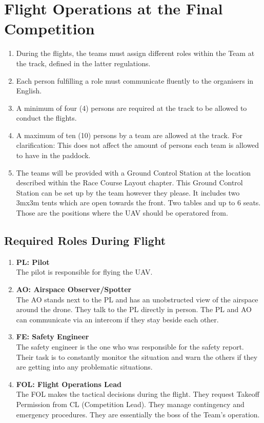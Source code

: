     \section{Flight Operations at the Final Competition}
    \begin{enumerate}
      \item During the flights, the teams must assign different roles within the Team at the track, defined in the latter regulations.
      \item Each person fulfilling a role must communicate fluently to the organisers in English.
      \item A minimum of four (4) persons are required at the track to be allowed to conduct the flights.
      \item A maximum of ten (10) persons by a team are allowed at the track. For clarification: This does not affect the amount of persons each team is allowed to have in the paddock.  
      \item The teams will be provided with a Ground Control Station at the location described within the Race Course Layout chapter. This Ground Control Station can be set up by the team however they please. It includes two 3mx3m tents which are open towards the front. Two tables and up to 6 seats. Those are the positions where the UAV should be operatored from.
    \end{enumerate}

    \subsection{Required Roles During Flight}
    \begin{enumerate}
      \item \textbf{PL: Pilot}\\The pilot is responsible for flying the UAV.
      \item \textbf{AO: Airspace Observer/Spotter}\\The AO stands next to the PL and has an unobstructed view of the airspace around the drone. They talk to the PL directly in person. The PL and AO can communicate via an intercom if they stay beside each other. 
      \item \textbf{FE: Safety Engineer}\\The safety engineer is the one who was responsible for the safety report. Their task is to constantly monitor the situation and warn the others if they are getting into any problematic situations. 
      \item \textbf{FOL: Flight Operations Lead}\\The FOL makes the tactical decisions during the flight. They request Takeoff Permission from CL (Competition Lead). They manage contingency and emergency procedures. They are essentially the boss of the Team's operation.
    \end{enumerate}


